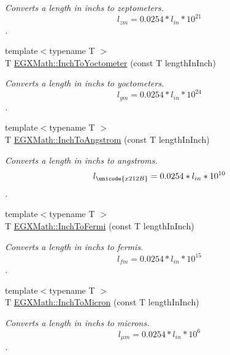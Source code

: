\begin{DoxyCompactItemize}
\begin{DoxyCompactList}\small\item\em Converts a length in inchs to zeptometers. \[ l_{zm}=0.0254 * l_{in} * 10^{21} \]. \end{DoxyCompactList}\item 
{\footnotesize template$<$typename T $>$ }\\T \mbox{\hyperlink{group___e_g_x_math-_conversions-_length_conversions-_imperial-_inch-_s_i_gaa74c358f0539e80771235b9fe0895282}{E\+G\+X\+Math\+::\+Inch\+To\+Yoctometer}} (const T length\+In\+Inch)
\begin{DoxyCompactList}\small\item\em Converts a length in inchs to yoctometers. \[ l_{ym}=0.0254 * l_{in} * 10^{24} \]. \end{DoxyCompactList}\item 
{\footnotesize template$<$typename T $>$ }\\T \mbox{\hyperlink{group___e_g_x_math-_conversions-_length_conversions-_imperial-_inch-_non-_s_i_ga37c2030e31292fe77b024bffaf4c7f9b}{E\+G\+X\+Math\+::\+Inch\+To\+Angstrom}} (const T length\+In\+Inch)
\begin{DoxyCompactList}\small\item\em Converts a length in inchs to angstroms. \[ l_{\unicode{x212B}}=0.0254 * l_{in} * 10^{10} \]. \end{DoxyCompactList}\item 
{\footnotesize template$<$typename T $>$ }\\T \mbox{\hyperlink{group___e_g_x_math-_conversions-_length_conversions-_imperial-_inch-_non-_s_i_ga60087eace30a405617328d7c3ac3efb3}{E\+G\+X\+Math\+::\+Inch\+To\+Fermi}} (const T length\+In\+Inch)
\begin{DoxyCompactList}\small\item\em Converts a length in inchs to fermis. \[ l_{fm}=0.0254 * l_{in} * 10^{15} \]. \end{DoxyCompactList}\item 
{\footnotesize template$<$typename T $>$ }\\T \mbox{\hyperlink{group___e_g_x_math-_conversions-_length_conversions-_imperial-_inch-_non-_s_i_ga28d3076041cdf54ce5c25f834fb16128}{E\+G\+X\+Math\+::\+Inch\+To\+Micron}} (const T length\+In\+Inch)
\begin{DoxyCompactList}\small\item\em Converts a length in inchs to microns. \[ l_{\mu m}=0.0254 * l_{in} * 10^{6} \]. \end{DoxyCompactList}\item 

\end{DoxyCompactItemize}
